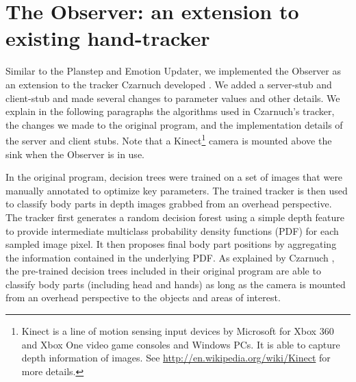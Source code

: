 \section{The Observer: an extension to existing hand-tracker}

Similar to the Planstep and Emotion Updater, we implemented the Observer as an extension to the tracker Czarnuch developed \cite{czarnuch2014}. We added a server-stub and client-stub and made several changes to parameter values and other details. We explain in the following paragraphs the algorithms used in Czarnuch's tracker, the changes we made to the original program, and the implementation details of the server and client stubs. Note that a Kinect\footnote{Kinect is a line of motion sensing input devices by Microsoft for Xbox 360 and Xbox One video game consoles and Windows PCs. It is able to capture depth information of images. See \url{http://en.wikipedia.org/wiki/Kinect} for more details.} camera is mounted above the sink when the Observer is in use.

In the original program, decision trees were trained on a set of images that were manually annotated to optimize key parameters. The trained tracker is then used to classify body parts in depth images grabbed from an overhead perspective. The tracker first generates a random decision forest using a simple depth feature to provide intermediate multiclass probability density functions (PDF) for each sampled image pixel. It then proposes final body part positions by aggregating the information contained in the underlying PDF. As explained by Czarnuch \cite{czarnuch2014}, the pre-trained decision trees included in their original program are able to classify body parts (including head and hands) as long as the camera is mounted from an overhead perspective to the objects and areas of interest. 

